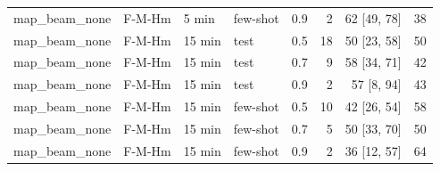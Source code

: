 \begin{table}[t]
\begin{tabular}{llllrrrr}
map\_beam\_none & F-M-Hm & 5 min & few-shot & 0.9 & 2 & 62 [49, 78] & 38 \\
map\_beam\_none & F-M-Hm & 15 min & test & 0.5 & 18 & 50 [23, 58] & 50 \\
map\_beam\_none & F-M-Hm & 15 min & test & 0.7 & 9 & 58 [34, 71] & 42 \\
map\_beam\_none & F-M-Hm & 15 min & test & 0.9 & 2 & 57 [8, 94] & 43 \\
map\_beam\_none & F-M-Hm & 15 min & few-shot & 0.5 & 10 & 42 [26, 54] & 58 \\
map\_beam\_none & F-M-Hm & 15 min & few-shot & 0.7 & 5 & 50 [33, 70] & 50 \\
map\_beam\_none & F-M-Hm & 15 min & few-shot & 0.9 & 2 & 36 [12, 57] & 64 \\
\bottomrule\end{tabular}
\end{table}
